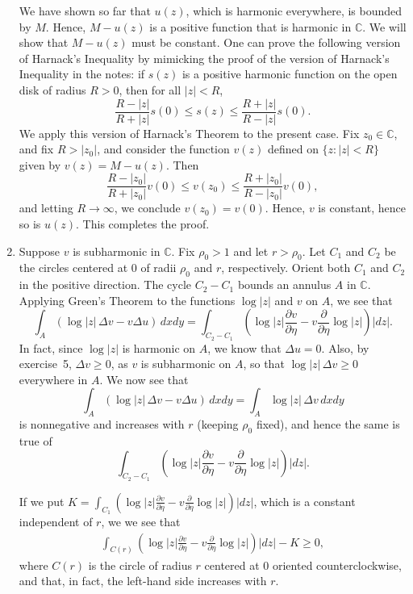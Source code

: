 \documentclass[11pt]{book}
\theoremstyle{definition}
\begin{document}
\begin{enumerate}
    We have shown so far that $u(z)$, which is harmonic everywhere, is bounded by $M$. Hence, $M- u(z)$ is a positive function that is harmonic in $\mathbb C$.  We will show that $M-u(z)$ must be constant.  One can prove the following version of Harnack's Inequality by mimicking the proof of the version of Harnack's Inequality in the notes: if $s(z)$ is a positive harmonic function on the open disk of radius $R>0$, then for all $|z| < R$,
    \[ \frac{R - |z|}{R+|z|} s(0) \leq s(z) \leq \frac{R+|z|}{R-|z|}s(0). \] 
    We apply this version of Harnack's Theorem to the present case.  Fix $z_0\in \mathbb C$, and fix $R>|z_0|$, and consider the function $v(z)$ defined on $\{ z : |z| < R \}$ given by $v(z) = M - u(z)$.  Then 
    \[ \frac{R - |z_0|}{R+|z_0|} v(0) \leq v(z_0) \leq \frac{R+|z_0|}{R-|z_0|}v(0), \] and letting $R\rightarrow \infty$, we conclude $v(z_0) = v(0)$.  Hence, $v$ is constant, hence so is $u(z)$.  This completes the proof. 

  \item  Suppose $v$ is subharmonic in $\mathbb C$. Fix $\rho_0 > 1$ and let $r > \rho_0$.  Let $C_1$ and $C_2$ be the circles centered at $0$ of radii $\rho_0$ and $r$, respectively.  Orient both $C_1$ and $C_2$ in the positive direction.  The cycle $C_2 - C_1$ bounds an annulus $A$ in $\mathbb C$.  Applying Green's Theorem to the functions $\log |z|$ and $v$ on $A$, we see that
    \[ \int_A (\log |z| \, \Delta v - v \Delta u) \, dx dy 
      = 
      \int_{C_2 - C_1} \left( \log |z| \frac{\partial v}{\partial \eta} - v \frac{\partial}{\partial \eta} \log |z| \right) |dz|. 
      \]  In fact, since $\log |z|$ is harmonic on $A$, we know that $\Delta u = 0$.  Also, by exercise~5, $\Delta v \geq 0$, as $v$ is subharmonic on $A$, so that $\log |z| \, \Delta v \geq 0$ everywhere in $A$.  %
      We now see that
    \[ \int_A (\log |z| \, \Delta v - v \Delta u ) \, dxdy  = \int_A  \log |z| \, \Delta v \, dxdy\] is nonnegative and increases with $r$ (keeping $\rho_0$ fixed), and hence the same is true of %
    \[  \int_{C_2 - C_1} \left( \log |z| \frac{\partial v}{\partial \eta} - v \frac{\partial}{\partial \eta} \log |z| \right) |dz|. \]
    
    If we put $K = \int_{C_1}\left( \log |z| \frac{\partial v}{\partial \eta} - v \frac{\partial}{\partial \eta} \log |z| \right) |dz|$, which is a constant independent of $r$, we we see that  
    \begin{align}
      \int_{C(r)} \left( \log |z| \frac{\partial v}{\partial \eta} - v \frac{\partial}{\partial \eta} \log |z| \right) |dz| - K \geq 0,  \label{eq:green}
    \end{align}where $C(r)$ is the circle of radius $r$ centered at $0$ oriented counterclockwise, and that, in fact, the left-hand side increases with $r$.  


\end{enumerate}
\end{document}
